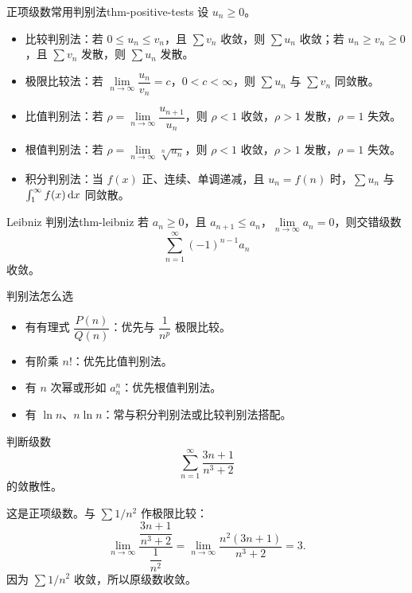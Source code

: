\begin{dl}{正项级数常用判别法}{thm-positive-tests}
设 $u_n\ge0$。
\begin{itemize}
  \item 比较判别法：若 $0\le u_n\le v_n$，且 $\sum v_n$ 收敛，则 $\sum u_n$ 收敛；若 $u_n\ge v_n\ge0$，且 $\sum v_n$ 发散，则 $\sum u_n$ 发散。
  \item 极限比较法：若 $\lim\limits_{n\to\infty}\dfrac{u_n}{v_n}=c$，$0<c<\infty$，则 $\sum u_n$ 与 $\sum v_n$ 同敛散。
  \item 比值判别法：若 $\rho=\lim\limits_{n\to\infty}\dfrac{u_{n+1}}{u_n}$，则 $\rho<1$ 收敛，$\rho>1$ 发散，$\rho=1$ 失效。
  \item 根值判别法：若 $\rho=\lim\limits_{n\to\infty}\sqrt[n]{u_n}$，则 $\rho<1$ 收敛，$\rho>1$ 发散，$\rho=1$ 失效。
  \item 积分判别法：当 $f(x)$ 正、连续、单调递减，且 $u_n=f(n)$ 时，$\sum u_n$ 与 $\int_1^\infty f(x)\mathop{}\!\mathrm{d} x$ 同敛散。
\end{itemize}
\end{dl}

\begin{dl}{Leibniz 判别法}{thm-leibniz}
若 $a_n\ge0$，且 $a_{n+1}\le a_n$，$\lim\limits_{n\to\infty}a_n=0$，则交错级数
\[
  \sum_{n=1}^{\infty}(-1)^{n-1}a_n
\]
收敛。
\end{dl}

\begin{methodbox}{判别法怎么选}
\begin{itemize}
  \item 有有理式 $\dfrac{P(n)}{Q(n)}$：优先与 $\dfrac1{n^p}$ 极限比较。
  \item 有阶乘 $n!$：优先比值判别法。
  \item 有 $n$ 次幂或形如 $a_n^n$：优先根值判别法。
  \item 有 $\ln n$、$n\ln n$：常与积分判别法或比较判别法搭配。
\end{itemize}
\end{methodbox}

\begin{problem}
判断级数
\[
  \sum_{n=1}^{\infty}\frac{3n+1}{n^3+2}
\]
的敛散性。
\end{problem}
\begin{solution}
这是正项级数。与 $\sum 1/n^2$ 作极限比较：
\[
  \lim_{n\to\infty}
  \frac{\dfrac{3n+1}{n^3+2}}{\dfrac1{n^2}}
  =\lim_{n\to\infty}\frac{n^2(3n+1)}{n^3+2}=3.
\]
因为 $\sum 1/n^2$ 收敛，所以原级数收敛。
\end{solution}

